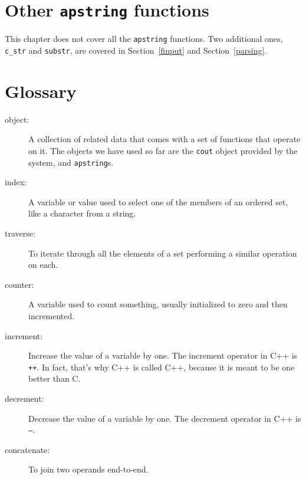 \section{Other {\tt apstring} functions}

This chapter does not cover all the {\tt apstring} functions.
Two additional ones, {\tt c\_str} and {\tt substr}, are covered
in Section~\ref{finput} and Section~\ref{parsing}.

\section{Glossary}

\begin{description}

\item[object:] A collection of related data that comes with a set of
functions that operate on it.  The objects we have used so far are the
{\tt cout} object provided by the system, and {\tt apstring}s.

\item[index:]  A variable or value used to select one of the
members of an ordered set, like a character from a string.

\item[traverse:]  To iterate through all the elements of a set
performing a similar operation on each.

\item[counter:]  A variable used to count something, usually
initialized to zero and then incremented.

\item[increment:]  Increase the value of a variable by one.
The increment operator in C++ is {\tt ++}.  In fact, that's
why C++ is called C++, because it is meant to be one better
than C.

\item[decrement:]  Decrease the value of a variable by one.
The decrement operator in C++ is {\tt --}.

\item[concatenate:] To join two operands end-to-end.


\end{description}

